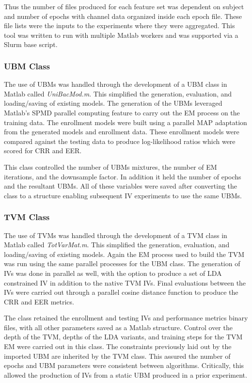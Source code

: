 Thus the number of files produced for each feature set was dependent on subject and number of epochs with channel data organized inside each epoch file. These file lists were the inputs to the experiments where they were aggregated. This tool was written to run with multiple Matlab workers and was supported via a Slurm base script.

\subsubsection{UBM Class}

The use of \acp{UBM} was handled through the development of a \acf{UBM} class in Matlab called \emph{UniBacMod.m}. This simplified the generation, evaluation, and loading/saving of existing models. The generation of the \acp{UBM} leveraged Matlab's \ac{SPMD} parallel computing feature to carry out the \ac{EM} process on the training data. The enrollment models were built using a parallel \ac{MAP} adaptation from the generated models and enrollment data. These enrollment models were compared against the testing data to produce log-likelihood ratios which were scored for \ac{CRR} and \ac{EER}.

This class controlled the number of \acp{UBM} mixtures, the number of \ac{EM} iterations, and the downsample factor. In addition it held the number of epochs and the resultant \acp{UBM}. All of these variables were saved after converting the class to a structure enabling subsequent \ac{IV} experiments to use the same \acp{UBM}.

\subsubsection{TVM Class}

The use of \acp{TVM} was handled through the development of a \acf{TVM} class in Matlab called \emph{TotVarMat.m}. This simplified the generation, evaluation, and loading/saving of existing models. Again the \ac{EM} process used to build the \ac{TVM} was run using the same parallel processes for the \ac{UBM} class. The generation of \acp{IV} was done in parallel as well, with the option to produce a set of \ac{LDA} constrained \ac{IV} in addition to the native \ac{TVM} \acp{IV}. Final evaluations between the \acp{IV} were carried out through a parallel cosine distance function to produce the \ac{CRR} and \ac{EER} metrics. 

The class retained the enrollment and testing \acp{IV} and performance metrics binary files, with all other parameters saved as a Matlab structure. Control over the depth of the \ac{TVM}, depths of the \ac{LDA} variants, and training steps for the \ac{TVM} \ac{EM} were carried out in this class. The constraints previously laid out by the imported \ac{UBM} are inherited by the \ac{TVM} class. This assured the number of epochs and \ac{UBM} parameters were consistent between algorithms. Critically, this allowed the production of \acp{IV} from a static \ac{UBM} produced in a prior experiment.

